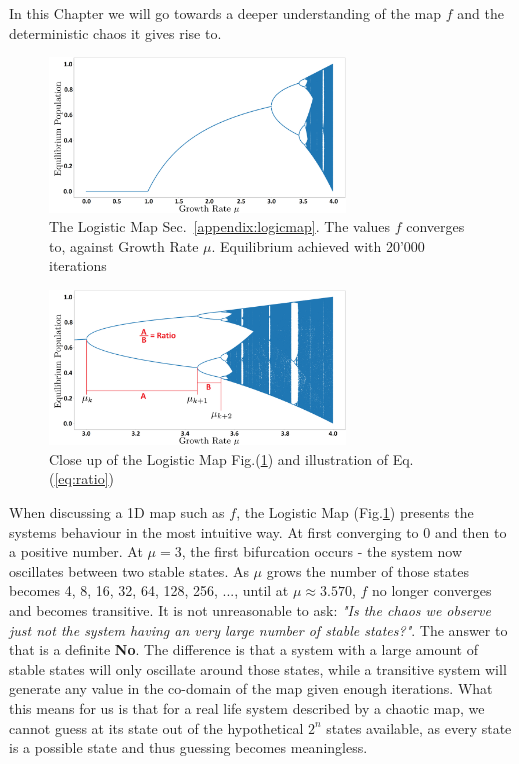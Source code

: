 In this Chapter we will go towards a deeper understanding of the map $f$
and the deterministic chaos it gives rise to.


\begin{figure}[h]
    \centering
    \includegraphics[width=0.7\textwidth]{Images/faigengeneral1.png}
    \caption{The Logistic Map Sec.~\ref{appendix:logicmap}. The values $f$ converges to, against Growth Rate $\mu$.
    Equilibrium achieved with 20'000 iterations}
    \label{fig:feigen1}
\end{figure}

\begin{figure}[h]
    \centering
    \includegraphics[width=0.7\textwidth]{Images/feigen3.png}
    \caption{Close up of the Logistic Map Fig.(\ref{fig:feigen1}) and illustration of
            Eq.(\ref{eq:ratio})}
    \label{fig:feigen2}
\end{figure}

When discussing a 1D map such as $f$, the Logistic Map (Fig.\ref{fig:feigen1}) presents 
the systems behaviour in the most intuitive way. At first converging 
to 0 and then to a positive number. At $\mu = 3$, the first bifurcation 
occurs - the system now oscillates between two stable states. As $\mu$
grows the number of those states becomes 4, 8, 16, 32, 64, 128, 256, ...,
until at $\mu \approx 3.570$, $f$ no longer converges and becomes
transitive. It is not unreasonable to ask: \textit{"Is the chaos we
observe just not the system having an very large number of stable states?"}.
The answer to that is a definite \textbf{No}. The difference is that 
a system with a large amount of stable states will only oscillate around those states,
while a transitive system will generate any value in the co-domain of the map
given enough iterations. What this means for us is that for a real life system described by 
a chaotic map, we cannot guess at its state out of the hypothetical $2^n$ states available,
as every state is a possible state and thus guessing becomes meaningless.
